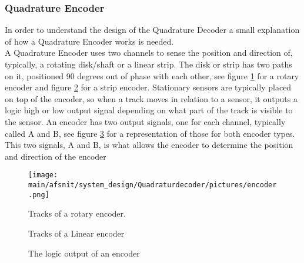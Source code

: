 \documentclass[../../../main]{subfiles}
\begin{document}
\subsubsection{Quadrature Encoder}
\label{sub:Theory}
In order to understand the design of the Quadrature Decoder a small explanation of how a Quadrature Encoder works is needed. \\
A Quadrature Encoder uses two channels to sense the position and direction of, typically, a rotating disk/shaft or a linear strip. The disk or strip has two paths on it, positioned 90 degrees out of phase with each other, see figure \ref{rotary_encoder} for a rotary encoder and figure \ref{channels} for a strip encoder. Stationary sensors are typically placed on top of the encoder, so when a track moves in relation to a sensor, it outputs a logic high or low output signal depending on what part of the track is visible to the sensor. An encoder has two output signals, one for each channel, typically called A and B, see figure \ref{output_channels} for a representation of those for both encoder types. This two signals, A and B, is what allows the encoder to determine the position and direction of the encoder

\begin{figure}[H]
  \texttt{[image: \\main/afsnit/system\_design/Quadraturdecoder/pictures/encoder.png]}
  \caption{Tracks of a rotary encoder.}
  \label{rotary_encoder}
\end{figure}


\begin{figure}[H]
  \centering
  \def\svgwidth{\columnwidth}
  \fontsize{9}{9}\selectfont
  
  \caption{Tracks of a Linear encoder}
  \label{channels}
\end{figure}

\begin{figure}[H]
  \centering
  \def\svgwidth{\columnwidth}
  \fontsize{9}{9}\selectfont
  
  \caption{The logic output of an encoder}
  \label{output_channels}
\end{figure}
\end{document}
